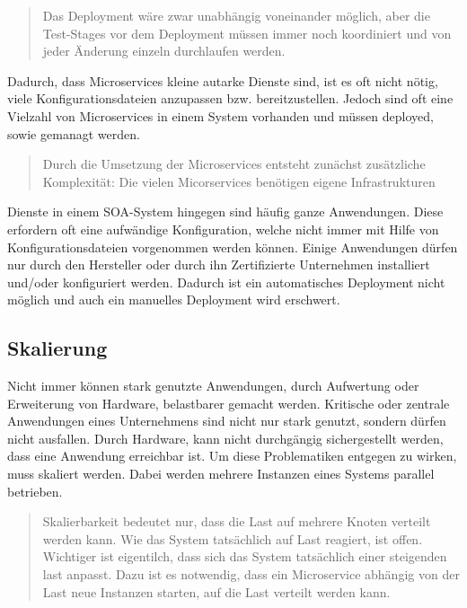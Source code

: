 \begin{quotation}
	\frqq Das Deployment wäre zwar unabhängig voneinander möglich, aber die Test-Stages vor dem Deployment müssen immer noch koordiniert und von jeder Änderung einzeln durchlaufen werden.\flqq\ \cite[S. 19]{EWolff2016:Microservices}
\end{quotation}

Dadurch, dass Microservices kleine autarke Dienste sind, ist es oft nicht nötig, viele Konfigurationsdateien anzupassen bzw. bereitzustellen. Jedoch sind oft eine Vielzahl von Microservices in einem System vorhanden und müssen deployed, sowie gemanagt werden.

\begin{quotation}
	\frqq Durch die Umsetzung der Microservices entsteht zunächst zusätzliche Komplexität: Die vielen Micorservices benötigen eigene Infrastrukturen\flqq\ \cite[S. 18]{EWolff2016:Microservices}
\end{quotation}

Dienste in einem SOA-System hingegen sind häufig ganze Anwendungen. Diese erfordern oft eine aufwändige Konfiguration, welche nicht immer mit Hilfe von Konfigurationsdateien vorgenommen werden können. Einige Anwendungen dürfen nur durch den Hersteller oder durch ihn Zertifizierte Unternehmen installiert und/oder konfiguriert werden. Dadurch ist ein automatisches Deployment nicht möglich und auch ein manuelles Deployment wird erschwert.

\subsection{Skalierung}
\label{subsec:Skalierung}
Nicht immer können stark genutzte Anwendungen, durch Aufwertung oder Erweiterung von Hardware, belastbarer gemacht werden. Kritische oder zentrale Anwendungen eines Unternehmens sind nicht nur stark genutzt, sondern dürfen nicht ausfallen. Durch Hardware, kann nicht durchgängig sichergestellt werden, dass eine Anwendung erreichbar ist. Um diese Problematiken entgegen zu wirken, muss skaliert werden. Dabei werden mehrere Instanzen eines Systems parallel betrieben.

\begin{quotation}
	\frqq Skalierbarkeit bedeutet nur, dass die Last auf mehrere Knoten verteilt werden kann. Wie das System tatsächlich auf Last reagiert, ist offen. Wichtiger ist eigentilch, dass sich das System tatsächlich einer steigenden last anpasst. Dazu ist es notwendig, dass ein Microservice abhängig von der Last neue Instanzen starten, auf die Last verteilt werden kann.\flqq\ \cite[S. 151]{EWolff2016:Microservices}
\end{quotation}

